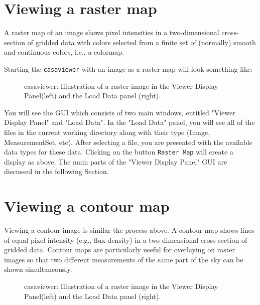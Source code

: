 \section{Viewing a raster map}
\label{section:viewer.raster}

A raster map of an image shows pixel intensities in a two-dimensional
cross-section of gridded data with colors selected from a finite set
of (normally) smooth and continuous colors, i.e., a colormap.

Starting the {\tt casaviewer} with an image as a raster map will look
something like: 

\begin{figure}[ht]
\caption{\label{fig:viewer1} casaviewer: Illustration of a raster
  image in the Viewer Display Panel(left) and the Load Data panel
  (right).} 
\hrulefill
\end{figure}
 

You will see the GUI which consists of two main windows, entitled
"Viewer Display Panel" and "Load Data". In the "Load Data" panel, you
will see all of the files in the current working directory along with
their type (Image, MeasurementSet, etc).  After selecting a file, you
are presented with the available data types for these data. Clicking
on the button {\tt Raster Map} will create a display as above. The main
parts of the "Viewer Display Panel" GUI are discussed in the following
Section.

\section{Viewing a contour map}
\label{section:viewer.contour}

Viewing a contour image is similar the process above. A contour map
shows lines of equal pixel intensity (e.g., flux density) in a two
dimensional cross-section of gridded data. Contour maps are
particularly useful for overlaying on raster images so that two
different measurements of the same part of the sky can be shown
simultaneously. 

\begin{figure}[h]
\caption{\label{fig:viewer5} casaviewer: Illustration of a raster
  image in the Viewer Display Panel(left) and the Load Data panel
  (right).} 
\hrulefill
\end{figure}
 
